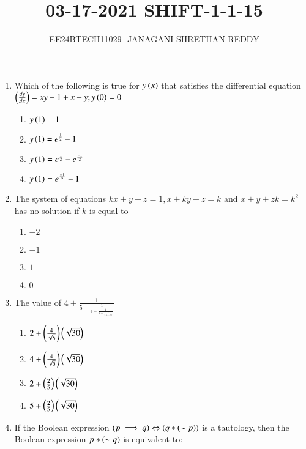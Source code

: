 \documentclass[journal,12pt,twocolumn]{IEEEtran}
\theoremstyle{remark}
\begin{document}
 


\vspace{3cm}

\title{03-17-2021 SHIFT-1-1-15}

\author{EE24BTECH11029- JANAGANI SHRETHAN REDDY}
\maketitle{}
\newpage
\bigskip
\renewcommand{\thefigure}{\theenumi}
\renewcommand{\thetable}{\theenum}
\begin{enumerate}
    \item Which of the following is true for $y\left(x\right)$ that satisfies the differential equation $\left(\frac{dy}{dx}\right)=xy-1+x-y;y\left(0\right)=0$
    \begin{enumerate}
        \item $y\left(1\right)=1$
        \item $y\left(1\right)=e^{\frac{1}{2}}-1$
        \item $y\left(1\right)=e^{\frac{1}{2}}-e^{\frac{-1}{2}}$
        \item $y\left(1\right)=e^{\frac{-1}{2}}-1$\\
    \end{enumerate}
    \item The system of equations $kx+y+z=1, x+ky+z=k$ and $x+y+zk=k^2$ has no solution if $k$ is equal to
    \begin{enumerate}
        \item $-2$
        \item $-1$
        \item $1$
        \item $0$\\
    \end{enumerate}
    \item The value of $4+\frac{1}{5+\frac{1}{4+\frac{1}{5+\frac{1}{4+\dots\infty}}}}$
    \begin{enumerate}
        \item $2+\left(\frac{4}{\sqrt{5}}\right)\left(\sqrt{30}\right)$
        \item $4+\left(\frac{4}{\sqrt{5}}\right)\left(\sqrt{30}\right)$
        \item $2+\left(\frac{2}{5}\right)\left(\sqrt{30}\right)$
        \item $5+\left(\frac{2}{5}\right)\left(\sqrt{30}\right)$\\
    \end{enumerate}
    \item If the Boolean expression $\left(p\implies q\right)\Leftrightarrow\left(q*\left(\sim p\right)\right)$  is a tautology, then the Boolean expression $p*\left(\sim q\right)$ is equivalent to:

\end{enumerate}
\end{document}
